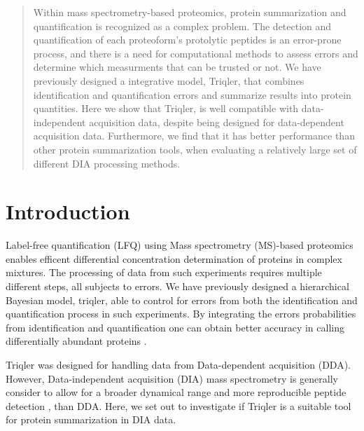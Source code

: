 \documentclass[10pt,letterpaper]{article}
\begin{document}
\maketitle




\begin{abstract}

Within mass spectrometry-based proteomics, protein summarization and quantification is recognized as a complex problem. The detection and quantification of each proteoform's protolytic peptides is an error-prone process, and there is a need for computational methods to assess errors and determine which measurments that can be trusted or not.  We have previously designed a integrative model, Triqler, that combines identification and quantification errors and summarize results into protein quantities. 
Here we show that Triqler, is well compatible with data-independent acquisition data, despite being designed for data-dependent acquisition data. Furthermore, we find that it has better performance than other protein summarization tools, when evaluating a relatively large set of different DIA processing methods. 

\end{abstract}
  

\section*{Introduction}
Label-free quantification (LFQ) using Mass spectrometry (MS)-based proteomics enables efficent differential concentration determination of proteins in complex mixtures. The processing of data from such experiments requires multiple different steps, all subjects to errors. We have previously designed a hierarchical Bayesian model, triqler, able to control for errors from both the identification and quantification process in such experiments\cite{The2018Integrated}. By integrating the errors probabilities from identification and quantification one can obtain better accuracy in calling differentially abundant proteins \cite{kall2020integrating}.   

Triqler was designed for handling data from Data-dependent acquisition (DDA). However, Data-independent acquisition (DIA) mass spectrometry \cite{venable2004automated} is generally consider to allow for a broader dynamical range and more reproducible peptide detection \cite{zhang2020DIA, Lu2021DIAmeter}, than DDA. Here, we set out to investigate if Triqler is a suitable tool for protein summarization in DIA data.
\end{document}
